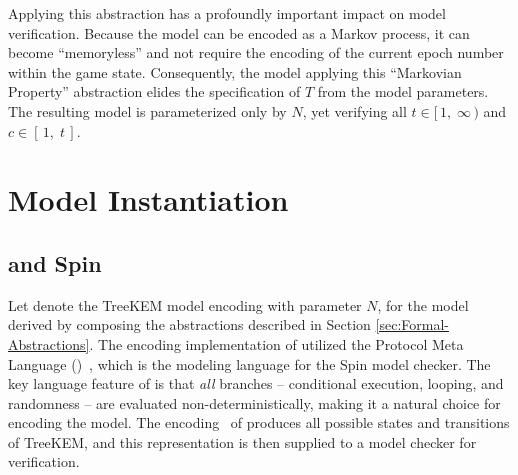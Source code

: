 \documentclass[runningheads]{llncs}
\newcommand{\NumericRange}[2]{\ensuremath{\left[\,#1,\; #2\,\right]}\xspace}
\newcommand{\NumericRangeOpenR}[2]{\ensuremath{[\,#1,\; #2\,)}\xspace}
\begin{document}
Applying this abstraction has a profoundly important impact on model verification.
Because the model can be encoded as a Markov process, it can become ``memoryless'' and not require the encoding of the current epoch number within the game state.
Consequently, the model applying this ``Markovian Property'' abstraction elides the specification of $T$ from the model parameters.
The resulting model is parameterized only by $N$, yet verifying all $t \in \NumericRangeOpenR{1}{\infty}$ and $c \in \NumericRange{1}{t}$.


\section{Model Instantiation}

\subsection{\Promela and Spin}

\newcommand\dblwrr{\wr\mkern-2mu\wr}

Let  denote the TreeKEM model encoding with parameter $N$, for the model derived by composing the abstractions described in Section \ref{sec:Formal-Abstractions}.
The encoding implementation of  utilized the Protocol Meta Language (\Promela)~\cite{HolzmannSpinBook2003}, 
which is the modeling language for the Spin model checker. 
The key language feature of \Promela is that \emph{all} branches -- conditional execution, looping, and randomness -- are evaluated non-deterministically, making it a natural choice for encoding the model.
The \Promela encoding~\cite{WashburnModelSPIN2024}
of  produces all possible states and transitions of TreeKEM, and this representation is then supplied to a model checker for verification.
\end{document}
